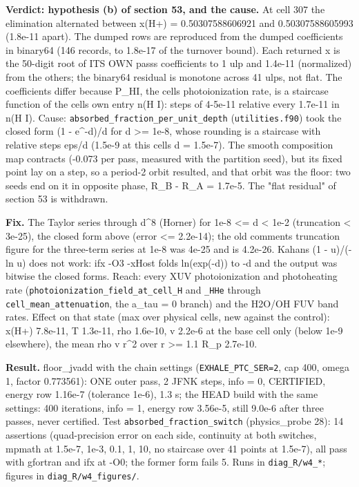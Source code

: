 \documentclass[english,a4paper]{my_memo}
\begin{document}
\textbf{Verdict: hypothesis (b) of section 53, and the cause.} At cell 307 the
elimination alternated between x(H+) = 0.50307588606921 and
0.50307588605993 (1.8e-11 apart). The dumped rows are reproduced from the
dumped coefficients in binary64 (146 records, to 1.8e-17 of the turnover
bound). Each returned x is the 50-digit root of ITS OWN pass\textquotesingle s coefficients
to 1 ulp and 1.4e-11 (normalized) from the other\textquotesingle s; the binary64 residual is
monotone across 41 ulps, not flat. The coefficients differ because P\_HI,
the cell\textquotesingle s photoionization rate, is a staircase function of the cell\textquotesingle s own
entry n(H I): steps of 4-5e-11 relative every 1.7e-11 in n(H I).
Cause: \texttt{absorbed\_fraction\_per\_unit\_depth} (\texttt{utilities.f90}) took the closed
form (1 - e\^{}-d)/d for d \textgreater= 1e-8, whose rounding is a staircase with
relative steps eps/d (1.5e-9 at this cell\textquotesingle s d = 1.5e-7). The smooth
composition map contracts (-0.073 per pass, measured with the partition
seed), but its fixed point lay on a step, so a period-2 orbit resulted, and
that orbit was the floor: two seeds end on it in opposite phase,
\textbar\textbar R\_B - R\_A\textbar\textbar{} = 1.7e-5. The "flat residual" of section 53 is withdrawn.

\textbf{Fix.} The Taylor series through d\^{}8 (Horner) for 1e-8 \textless= d \textless{} 1e-2
(truncation \textless{} 3e-25), the closed form above (error \textless= 2.2e-14); the old
comment\textquotesingle s truncation figure for the three-term series at 1e-8 was 4e-25 and
is 4.2e-26. Kahan\textquotesingle s (1 - u)/(-ln u) does not work: ifx -O3 -xHost folds
ln(exp(-d)) to -d and the output was bitwise the closed form\textquotesingle s. Reach: every
XUV photoionization and photoheating rate (\texttt{photoionization\_field\_at\_cell\_H}
and \texttt{\_HHe} through \texttt{cell\_mean\_attenuation}, the a\_tau = 0 branch) and the
H2O/OH FUV band rates. Effect on that state (max over
physical cells, new against the control): x(H+) 7.8e-11, T 1.3e-11, rho
1.6e-10, v 2.2e-6 at the base cell only (below 1e-9 elsewhere), the mean
rho v r\^{}2 over r \textgreater= 1.1 R\_p 2.7e-10.

\textbf{Result.} floor\_jvadd with the chain settings (\texttt{EXHALE\_PTC\_SER=2}, cap
400, omega 1, factor 0.773561): ONE outer pass, 2 JFNK steps, info = 0,
CERTIFIED, energy row 1.16e-7 (tolerance 1e-6), 1.3 s; the HEAD build with
the same settings: 400 iterations, info = 1, energy row 3.56e-5, still
9.0e-6 after three passes, never certified. Test \texttt{absorbed\_fraction\_switch}
(physics\_probe 28): 14 assertions (quad-precision error on each side,
continuity at both switches, mpmath at 1.5e-7, 1e-3, 0.1, 1, 10, no
staircase over 41 points at 1.5e-7), all pass with gfortran and ifx at -O0;
the former form fails 5. Runs in \texttt{diag\_R/w4\_*}; figures in
\texttt{diag\_R/w4\_figures/}.
\end{document}
